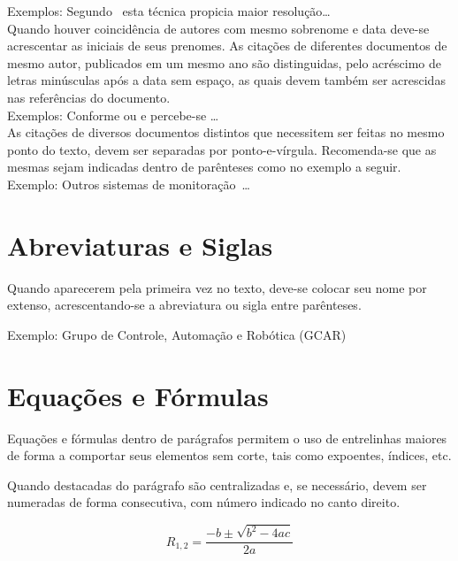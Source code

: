 \documentclass[repeatfields,xlists,xpacks,oneside]{ufrgscca}
\begin{document}
Exemplos: Segundo~\textcite{Brito:IEE-1994} esta técnica propicia maior
resolução\ldots\\

Quando houver coincidência de autores com mesmo sobrenome e data deve-se
acrescentar as iniciais de seus prenomes. As citações de diferentes
documentos de mesmo autor, publicados em um mesmo ano são distinguidas, pelo
acréscimo de letras minúsculas após a data sem espaço, as quais devem também
ser acrescidas nas referências do documento.\\

Exemplos: Conforme \cite{Pereira:OORT1999-133} ou \cite{Pereira:OORT1999-155} e
\cite{Pereira:RTP1999-9} percebe-se \ldots\\

As citações de diversos documentos distintos que necessitem ser feitas no
mesmo ponto do texto, devem ser separadas por ponto-e-vírgula. Recomenda-se
que as mesmas sejam indicadas dentro de parênteses como no exemplo a
seguir.\\

Exemplo: Outros sistemas de
monitoração~\cite{Baturone:DCIS1996-231,Cota:TIM-49-2}\ldots\\

\section{Abreviaturas e Siglas}

Quando aparecerem pela primeira vez no texto, deve-se colocar seu nome por
extenso, acrescentando-se a abreviatura ou sigla entre parênteses.

Exemplo:   Grupo de Controle, Automação e Robótica (GCAR)

\section{Equações e Fórmulas}

Equações e fórmulas dentro de parágrafos permitem o uso de entrelinhas
maiores de forma a comportar seus elementos sem corte, tais como expoentes,
índices, etc.

Quando destacadas do parágrafo são centralizadas e, se necessário, devem ser
numeradas de forma consecutiva, com número indicado no canto direito.

\begin{equation}
R_{1,2}=\frac{-b\pm\sqrt{b^2-4ac}}{2a}
\end{equation}
\end{document}

